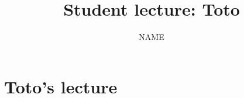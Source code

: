 \documentclass[11pt,reqno,oneside,a4paper]{article}
\title{Student lecture: Toto}
\author{NAME}
\begin{document}

\maketitle
\thispagestyle{fancy}


\section{Toto's lecture} \label{sec:Toto}

\end{document}
